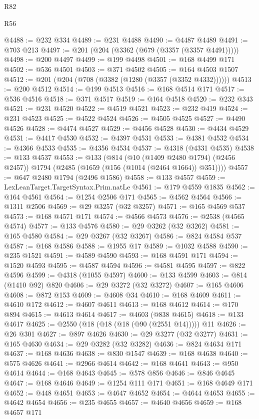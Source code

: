 \begin{lexlean}{R82}
\begin{lexlean}{R56}
\begin{coremodule}
{{{{{{{{{{{{{{{{{{{{{{{{{{{{{{{{{{{{{{{{{{{{{{{{{{{{{{{{{{{{{{{{{{{{{{{{{{{{{{{{{{{{{{{{{{{{{{{{{{{{{{{{{{{{{{{{{{{{{{{{{{{{{{{{{{{{{{{{{{{{{{{{{{{{{{{{{{{{{{{{{{{{{{{{{{{{{{{{{{{{{{{{{{{{{{{{{{{{{{{{{{{{{{{{{{{@4488 := @232 @334
@4489 := @231 @4488
@4490 := @4487 @4489
@4491 := @703 @213
@4497 := @201 (@204 (@3362 (@679 (@3357 (@3357 @4491)))))
@4498 := @200 @4497
@4499 := @199 @4498
@4501 := @168 @4499 @171
@4502 := @536 @4501
@4503 := @371 @4502
@4505 := @164 @4503 @1507
@4512 := @201 (@204 (@708 (@3382 (@1280 (@3357 (@3352 @4332))))))
@4513 := @200 @4512
@4514 := @199 @4513
@4516 := @168 @4514 @171
@4517 := @536 @4516
@4518 := @371 @4517
@4519 := @164 @4518
@4520 := @232 @343
@4521 := @231 @4520
@4522 := @4519 @4521
@4523 := @232 @419
@4524 := @231 @4523
@4525 := @4522 @4524
@4526 := @4505 @4525
@4527 := @4490 @4526
@4528 := @4474 @4527
@4529 := @4456 @4528
@4530 := @4434 @4529
@4531 := @4417 @4530
@4532 := @4397 @4531
@4533 := @4381 @4532
@4534 := @4366 @4533
@4535 := @4356 @4534
@4537 := @4318 (@4331 @4535)
@4538 := @133 @4537
@4553 := @133
    (@814
      (@10 (@1409 @2480 @1794) (@2456 @2457))
      @1794
      (@2485 (@1659 (@156 (@1014 (@2464 @1664)) @351))))
@4557 := @647 @2480 @1794 (@2496 @1586)
@4558 := @133 @4557
@4559 := LexLeanTarget.TargetSyntax.Prim.natLe
@4561 := @179 @4559 @1835
@4562 := @164 @4561
@4564 := @1254 @2506 @171
@4565 := @4562 @4564
@4566 := @1311 @2506
@4569 := @29 @3257 (@32 @3257)
@4571 := @165 @4569 @537
@4573 := @168 @4571 @171
@4574 := @4566 @4573
@4576 := @2538 (@4565 @4574)
@4577 := @133 @4576
@4580 := @29 @3262 (@32 @3262)
@4581 := @165 @4580
@4584 := @29 @3267 (@32 @3267)
@4586 := @824 @4584 @537
@4587 := @168 @4586
@4588 := @1955 @17
@4589 := @1032 @4588
@4590 := @235 @1521
@4591 := @4589 @4590
@4593 := @168 @4591 @171
@4594 := @1520 @4593
@4595 := @4587 @4594
@4596 := @4581 @4595
@4597 := @822 @4596
@4599 := @4318 (@1055 @4597)
@4600 := @133 @4599
@4603 := @814 (@1410 @92) @820
@4606 := @29 @3272 (@32 @3272)
@4607 := @165 @4606
@4608 := @872 @153
@4609 := @4608 @34
@4610 := @168 @4609
@4611 := @4610 @172
@4612 := @4607 @4611
@4613 := @168 @4612
@4614 := @170 @894
@4615 := @4613 @4614
@4617 := @4603 (@838 @4615)
@4618 := @133 @4617
@4625 := @2550 (@18 (@18 (@18 (@90 (@2551 @14))))) @11
@4626 := @26 @301
@4627 := @897 @4626
@4630 := @29 @3277 (@32 @3277)
@4631 := @165 @4630
@4634 := @29 @3282 (@32 @3282)
@4636 := @824 @4634 @171
@4637 := @168 @4636
@4638 := @830 @1547
@4639 := @168 @4638
@4640 := @575 @4626
@4641 := @2966 @4614
@4642 := @168 @4641
@4643 := @950 @4614
@4644 := @168 @4643
@4645 := @578 @856
@4646 := @846 @4645
@4647 := @168 @4646
@4649 := @1254 @111 @171
@4651 := @168 @4649 @171
@4652 := @448 @4651
@4653 := @4647 @4652
@4654 := @4644 @4653
@4655 := @4642 @4654
@4656 := @235 @4655
@4657 := @4640 @4656
@4659 := @168 @4657 @171
}}}}}}}}}}}}}}}}}}}}}}}}}}}}}}}}}}}}}}}}}}}}}}}}}}}}}}}}}}}}}}}}}}}}}}}}}}}}}}}}}}}}}}}}}}}}}}}}}}}}}}}}}}}}}}}}}}}}}}}}}}}}}}}}}}}}}}}}}}}}}}}}}}}}}}}}}}}}}}}}}}}}}}}}}}}}}}}}}}}}}}}}}}}}}}}}}}}}}}}}}}}}}}}}}}}
\end{coremodule}
\end{lexlean}
\end{lexlean}
